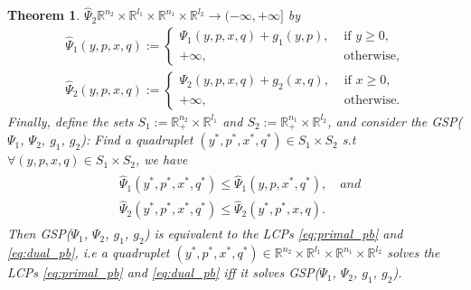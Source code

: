 \documentclass{article}
\newtheorem{theorem}{Theorem}
\begin{document}
\begin{theorem}
$\hat{\Psi}_2
\mathbb{R}^{n_2} \times \mathbb{R}^{l_1} \times \mathbb{R}^{n_1}
\times \mathbb{R}^{l_2} \rightarrow (-\infty, +\infty]$ by
\begin{eqnarray*}
    \hat{\Psi}_1(y, p, x, q) :=\begin{cases}
    \Psi_1(y, p, x, q)+ g_1(y, p), &\mbox{ if }y \ge 0,\\
    +\infty, &\mbox{ otherwise,}\end{cases}\\
    \hat{\Psi}_2(y, p, x, q) :=\begin{cases}
    \Psi_2(y, p, x, q)+ g_2(x, q), &\mbox{ if }x \ge 0,\\
    +\infty, &\mbox{ otherwise.}\end{cases}
\end{eqnarray*}
Finally, define the sets $S_1 := \mathbb{R}^{n_2}_+ \times
\mathbb{R}^{l_1}$ and $S_2 := \mathbb{R}^{n_1}_+ \times
\mathbb{R}^{l_2}$, and consider the GSP($\Psi_1$, $\Psi_2$, $g_1$,
$g_2$): Find a quadruplet $(y^*,p^*, x^*, q^*) \in S_1 \times S_2$
s.t $\forall (y,p, x, q) \in S_1 \times S_2$, we have
\begin{eqnarray}
  \begin{split}
    &\hat{\Psi}_1(y^*, p^*, x^*, q^*) \le \hat{\Psi}_1(y, p, x^*,
    q^*),\hspace{1em}and\\
    &\hat{\Psi}_2(y^*, p^*, x^*, q^*)
    \le \hat{\Psi}_2(y^*, p^*, x, q).
  \label{eq:unconstrained_pb}
\end{split}
\end{eqnarray}
\label{thm:pd}
Then GSP($\Psi_1$,
  $\Psi_2$, $g_1$, $g_2$) is equivalent to the LCPs
  \eqref{eq:primal_pb} and \eqref{eq:dual_pb}, i.e
a quadruplet $(y^*,p^*, x^*, q^*) \in \mathbb{R}^{n_2}
  \times \mathbb{R}^{l_1} \times \mathbb{R}^{n_1} \times
  \mathbb{R}^{l_2}$ solves the LCPs
  \eqref{eq:primal_pb} and \eqref{eq:dual_pb} iff it solves
  GSP($\Psi_1$, $\Psi_2$, $g_1$, $g_2$). 
  \label{thm:pd}
\end{theorem}
\end{document}
